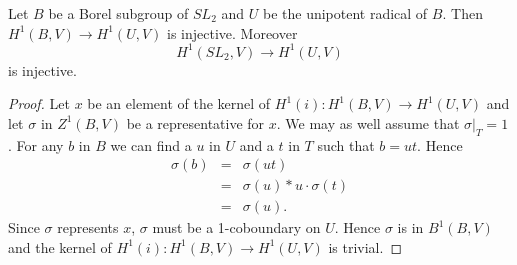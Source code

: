 \begin{lemma} Let $B$ be a Borel subgroup of $SL_2$ and $U$ be the unipotent radical of $B$. Then $H^1(B, V)\rightarrow H^1(U, V)$ is injective. Moreover
\begin{displaymath}
	H^1(SL_2, V)\rightarrow H^1(U, V)
\end{displaymath}
is injective.
\end{lemma}
\begin{proof}
Let $x$ be an element of the kernel of $H^1(i):H^1(B,V)\rightarrow H^1(U,V)$ and let $\sigma$ in $Z^1(B,V)$ be a representative for $x$. We may as well assume that $\sigma|_T = 1$. For any $b$ in $B$ we can find a $u$ in $U$ and a $t$ in $T$ such that $b = ut$. Hence
\begin{eqnarray*}
	\sigma(b) &=& \sigma(ut) \\
	&=& \sigma(u) * u\cdot\sigma(t) \\
	&=& \sigma(u).
\end{eqnarray*}
Since $\sigma$ represents $x$, $\sigma$ must be a 1-coboundary on $U$. Hence $\sigma$ is in $B^1(B, V)$ and the kernel of $H^1(i):H^1(B,V)\rightarrow H^1(U,V)$ is trivial.
\end{proof}
